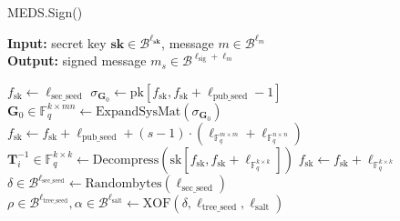 \begin{algorithm}[H]
\caption{MEDS.Sign()}\label{alg:medssign}
\hspace*{\algorithmicindent} \textbf{Input:} secret key $\textbf{sk} \in \mathcal{B}^{\ell_\textbf{sk}}$, message $m \in \mathcal{B}^{\ell_m}$\\
\hspace*{\algorithmicindent} \textbf{Output:} signed message $m_s \in \mathcal{B}^{\ell_\text{sig} + \ell_m}$
\begin{algorithmic}[1]
\State $f_\text{sk} \gets \ell_\text{sec\_seed}$
\State $\sigma_{\textbf{G}_0} \gets \text{pk}[f_\text{sk}, f_\text{sk} + \ell_\text{pub\_seed} - 1]$
\State $\textbf{G}_0 \in \mathds{F}_q^{k \times mn} \gets \text{ExpandSysMat}(\sigma_{\textbf{G}_0})$
\State $f_\text{sk} \gets f_\text{sk} + \ell_\text{pub\_seed} + (s - 1) \cdot (\ell_{\mathds{F}_q^{m \times m}} + \ell_{\mathds{F}_q^{n \times n}})$
    \State $\textbf{T}_i^{-1} \in \mathds{F}_q^{k \times k} \gets \text{Decompress}(\text{sk}[f_\text{sk}, f_\text{sk} + \ell_{\mathds{F}_q^{k \times k}}])$
    \State $f_\text{sk} \gets f_\text{sk} + \ell_{\mathds{F}_q^{k \times k}}$
\EndFor
\State $\delta \in \mathcal{B}^{\ell_\text{sec\_seed}} \gets \text{Randombytes}(\ell_\text{sec\_seed})$
\State $\rho \in \mathcal{B}^{\ell_\text{tree\_seed}}, \alpha \in \mathcal{B}^{\ell_\text{salt}} \gets \text{XOF}(\delta, \ell_\text{tree\_seed}, \ell_\text{salt})$

\end{algorithmic}
\end{algorithm}
